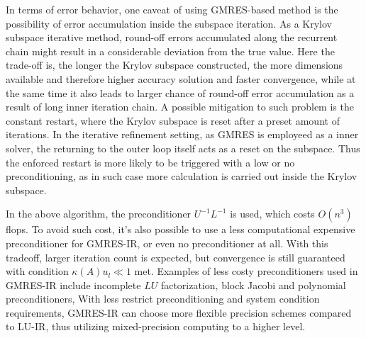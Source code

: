 In terms of error behavior, one caveat of using GMRES-based method is the possibility of error accumulation inside the subspace iteration. As a Krylov subspace iterative method, round-off errors accumulated along the recurrent chain might result in a considerable deviation from the true value. Here the trade-off is, the longer the Krylov subspace constructed, the more dimensions available and therefore higher accuracy solution and faster convergence, while at the same time it also leads to larger chance of round-off error accumulation as a result of long inner iteration chain. A possible mitigation to such problem is the constant restart, where the Krylov subspace is reset after a preset amount of iterations. In the iterative refinement setting, as GMRES is employeed as a inner solver, the returning to the outer loop itself acts as a reset on the subspace. Thus the enforced restart is more likely to be triggered with a low or no preconditioning, as in such case more calculation is carried out inside the Krylov subspace.

In the above algorithm, the preconditioner $U^{-1}L^{-1}$ is used, which costs $O(n^3)$ flops. To avoid such cost, it's also possible to use a less computational expensive preconditioner for GMRES-IR, or even no preconditioner at all. With this tradeoff, larger iteration count is expected, but convergence is still guaranteed with condition $\kappa(A)u_l \ll 1$ met. Examples of less costy preconditioners used in GMRES-IR include  incomplete $LU$ factorization, block Jacobi and polynomial preconditioners\cite{Loe2021},  With less restrict preconditioning and system condition requirements, GMRES-IR can choose more flexible precision schemes compared to LU-IR, thus utilizing mixed-precision computing to a higher level. 

\clearpage




